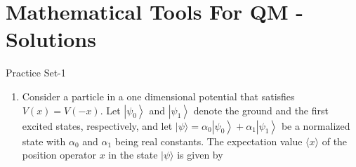 \chapter{Mathematical Tools For QM - Solutions}
\begin{abox}
	Practice Set-1 
	\end{abox}
\begin{enumerate}

		\item Consider a particle in a one dimensional potential that satisfies $V(x)=V(-x)$. Let $\left|\psi_{0}\right\rangle$ and $\left|\psi_{1}\right\rangle$ denote the ground and the first excited states, respectively, and let $|\psi\rangle=\alpha_{0}\left|\psi_{0}\right\rangle+\alpha_{1}\left|\psi_{1}\right\rangle$ be a normalized state with $\alpha_{0}$ and $\alpha_{1}$ being real constants. The expectation value $\langle x\rangle$ of the position operator $x$ in the state $|\psi\rangle$ is given by
		{}


\end{enumerate}
